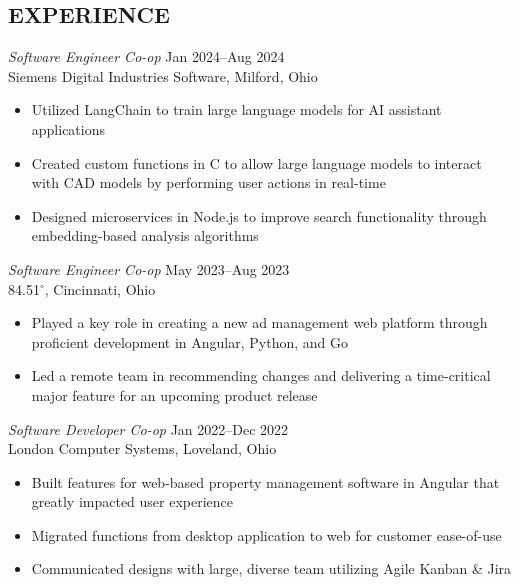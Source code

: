 \documentclass[margin]{res} %
\begin{document}
\begin{resume}
\vspace*{-7.5mm}
 
 
\section{EXPERIENCE}
{\sl Software Engineer Co-op} \hfill {\color{black} Jan 2024–Aug 2024} \\
Siemens Digital Industries Software, Milford, Ohio
\begin{itemize} \itemsep -2pt %
\item Utilized LangChain to train large language models for AI assistant applications 
\item Created custom functions in C to allow large language models to interact with CAD models by performing user actions in real-time
\item Designed microservices in Node.js to improve search functionality through\\embedding-based analysis algorithms
\end{itemize}

\vspace*{-1.5mm}

{\sl Software Engineer Co-op} \hfill {\color{black} May 2023–Aug 2023}  \\
84.51$^{\circ}$, Cincinnati, Ohio 
\begin{itemize} \itemsep -2pt %
\item Played a key role in creating a new ad management web platform through proficient development in Angular, Python, and Go
\item  Led a remote team in recommending changes and delivering a time-critical major feature for an upcoming product release
\end{itemize}

\vspace*{-1.5mm}

{\sl Software Developer Co-op} \hfill {\color{black} Jan 2022–Dec 2022}  \\
London Computer Systems, Loveland, Ohio 
\begin{itemize} \itemsep -2pt %
\item Built features for web-based property management software in Angular that greatly impacted user experience
\item Migrated functions from desktop application to web for customer ease-of-use
\item Communicated designs with large, diverse team utilizing Agile Kanban \& Jira
\end{itemize}


\end{resume}
\end{document}
